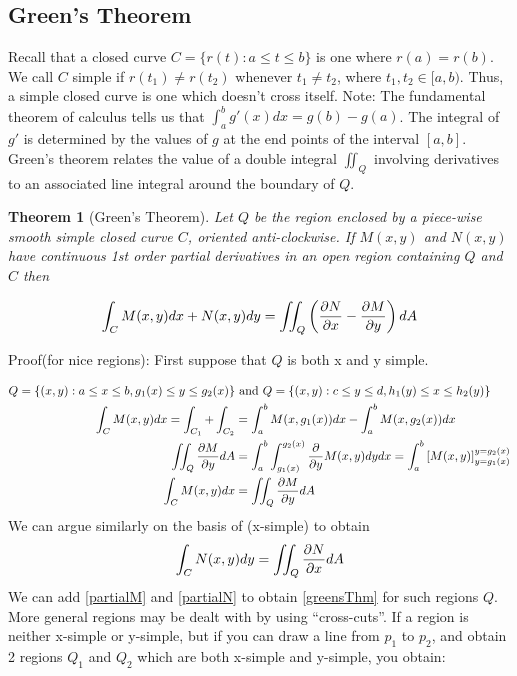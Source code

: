 \documentclass{article}
\newtheorem{theorem}{Theorem}[section]
\newcommand{\n}{\leavevmode \newline} %
\newcommand{\nn}{\leavevmode \newline \newline} %
\numberwithin{equation}{subsection} %
\begin{document}
\subsection{Green's Theorem}
Recall that a closed curve $C=\{ r(t) : a \leq t \leq b \}$ is one where $r(a)=r(b)$. We call $C$ simple if $r(t_1)\neq r(t_2)$ whenever $t_1\neq t_2$, where $t_1, t_2 \in [a,b)$. Thus, a simple closed curve is one which doesn't cross itself.
\nn
Note: The fundamental theorem of calculus tells us that $\int_a^b g'(x)dx = g(b)-g(a)$. The integral of $g'$ is determined by the values of $g$ at the end points of the interval $[a,b]$. Green's theorem relates the value of a double integral $\iint_Q$ involving derivatives to an associated line integral around the boundary of $Q$.

\begin{theorem}[Green's Theorem]
Let $Q$ be the region enclosed by a piece-wise smooth simple closed curve $C$, oriented anti-clockwise. If $M(x,y)$ and $N(x,y)$ have continuous 1st order partial derivatives in an open region containing $Q$ and $C$ then

\begin{equation}
    \int_C M(x,y)dx+N(x,y)dy = \iint_Q \left( \pdv{N}{x} - \pdv{M}{y}\right) dA
    \label{greensThm}
\end{equation}
\end{theorem}
\n
Proof(for nice regions): First suppose that $Q$ is both x and y simple.

\begin{equation}
    \begin{split}
        Q = \{ (x,y): a \leq x \leq b , g_1(x) \leq y \leq g_2(x) \} &\text{ and }Q = \{ (x,y): c \leq y \leq d, h_1(y) \leq x \leq h_2(y) \} \\
        \int_C M(x,y)dx = \int_{C_1} + \int_{C_2} &= \int_a^b M(x,g_1(x))dx-\int_a^b M(x,g_2(x))dx \\
        \iint_Q \pdv{M}{y}dA &= \int_a^b \int_{g_1(x)}^{g_2(x)} \pdv{y} M(x,y)dydx = \int_a^b \left[ M(x,y) \right]_{y=g_1(x)}^{y=g_2(x)} \\
        \int_C M(x,y) dx &= \iint_Q \pdv{M}{y}dA
        \label{partialM}
    \end{split}
\end{equation}
\n
We can argue similarly on the basis of (x-simple) to obtain
\begin{equation}
    \int_C N(x,y)dy = \iint_Q \pdv{N}{x}dA
    \label{partialN}
\end{equation}
We can add \eqref{partialM} and \eqref{partialN} to obtain \eqref{greensThm} for such regions $Q$. More general regions may be dealt with by using ``cross-cuts''. If a region is neither x-simple or y-simple, but if you can draw a line from $p_1$ to $p_2$, and obtain 2 regions $Q_1$ and $Q_2$ which are both x-simple and y-simple, you obtain:
\end{document}
